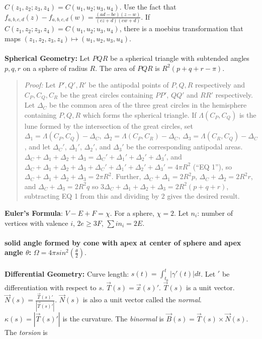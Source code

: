 $C(z_1, z_2; z_3, z_4) = C(u_1, u_2; u_3, u_4)$.
Use the fact that $f_{a,b,c,d}(z) - f_{a,b,c,d}(w) = {\frac {(ad-bc)(z-w)}{(cz+d)(cw+d)}}$.
If $C(z_1, z_2; z_3, z_4) = C(u_1, u_2; u_3, u_4)$, there is a moebius transformation that maps $(z_1, z_2, z_3, z_4) \mapsto (u_1, u_2, u_3, u_4)$.
\\
\\
{\bf Spherical Geometry:}  Let $PQR$ be a spherical triangle with subtended angles
$p, q, r$ on a sphere of radius $R$.  The area of $PQR$ is $R^2(p+q+r-\pi)$.
\begin{quote}
\emph{Proof:} Let $P', Q', R'$ be the antipodal points of $P, Q, R$ respectively and
$C_P, C_Q, C_R$ be the great circles containing $PP'$, $QQ'$ and $RR'$ respectively.
Let $\Delta_C$ be the common area of the three great circles in the hemisphere containing
$P, Q, R$ which forms the spherical triangle.  If $\Lambda(C_P, C_Q)$ 
is the lune formed by the intersection of the great circles, set 
$\Delta_1= \Lambda(C_P, C_Q) - \Delta_C$,
$\Delta_2= \Lambda(C_P, C_R) - \Delta_C$,
$\Delta_3= \Lambda(C_R, C_Q) - \Delta_C$, and let
$\Delta_C'$, $\Delta_1'$, $\Delta_2'$, and
$\Delta_3'$ be the corresponding antipodal areas.  
$\Delta_C+ \Delta_1+ \Delta_2+ \Delta_3= \Delta_C'+ \Delta_1'+ \Delta_2'+ \Delta_3'$,
and
$\Delta_C+ \Delta_1+ \Delta_2+ \Delta_3+\Delta_C'+ \Delta_1'+ \Delta_2'+ \Delta_3'
=4 \pi R^2$ (``EQ 1''), so
$\Delta_C+ \Delta_1+ \Delta_2+ \Delta_3= 2 \pi R^2$.  Further,
$\Delta_C + \Delta_1= 2 R^2 p$, $\Delta_C + \Delta_2= 2 R^2 r$, and
$\Delta_C + \Delta_3= 2 R^2 q$ so
$3\Delta_C+ \Delta_1+ \Delta_2+ \Delta_3 = 2 R^2 (p+q+r)$, 
subtracting EQ 1 from this and dividing by $2$ gives the desired result.
\end{quote}
{\bf Euler's Formula}: $V-E+F= \chi$. For a sphere, $\chi=2$.
Let $n_i$: number of vertices with valence $i$, $2e \geq 3F$, $\sum in_i = 2E$.
\\
\\
{\bf solid angle formed by cone with apex at center of sphere and apex angle $\theta$:}
$\Omega = 4 \pi sin^2({\frac {\theta} 2})$.
\\
\\
{\bf Differential Geometry:}
Curve length: $s(t)= \int_{t_0}^t | \gamma'(t)| dt$.  Let $'$ be differentiation with respect to
$s$.
${\vec T} (s)=  {\vec x(s)}'$.  ${\vec T} (s)$ is a unit vector. ${\vec N (s)} = {\frac {{\vec T} (s)'}
{|{\vec T} (s)'|}}$.  ${\vec N (s)}$ is also a unit vector called the \emph{normal}.  $\kappa(s)= |{\vec T} (s)'|$
is the curvature.  The \emph{binormal} is ${\vec B(s)} = {\vec T} (s) \times {\vec N (s)}$.  The \emph{torsion} is
